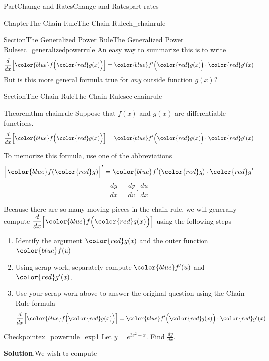\documentclass{tufte-book}
\newcommand{\blocktitlefont}{\relax}
\numberwithin{equation}{chapter}
\newcommand{\red}[1]{   {\color{red}   #1}   }
\newcommand{\blue}[1]{  {\color{blue}  #1}  }
\newcommand{\ddx}[1]{ \dfrac{d}{dx} \Big[ #1 \Big]  }
\newcommand{\D}[1]{ \Big[ #1 \Big]'  }
\begin{document}
\begin{partptx}{Part}{Change and Rates}{}{Change and Rates}{}{}{part-rates}
\begin{chapterptx}{Chapter}{The Chain Rule}{}{The Chain Rule}{}{}{ch_chainrule}
\begin{sectionptx}{Section}{The Generalized Power Rule}{}{The Generalized Power Rule}{}{}{sec_generalizedpowerrule}
An easy way to summarize this is to write%
\begin{equation*}
\ddx{ \blue{ f\Big(\red{g(x)}\Big) } } = \blue{f'\Big( \red{g(x)}\Big)}\cdot \red{g'(x)}
\end{equation*}
But is this more general formula true for \emph{any} outside function \(g(x)\)?%
\end{sectionptx}
%
%
\typeout{************************************************}
\typeout{************************************************}
%
\begin{sectionptx}{Section}{The Chain Rule}{}{The Chain Rule}{}{}{sec-chainrule}
\begin{theorem}{Theorem}{}{}{thm-chainrule}%
Suppose that \(f(x)\) and \(g(x)\) are differentiable functions.%
\begin{equation*}
\ddx{ \blue{ f\Big(\red{g(x)}\Big) } } = \blue{f'\Big( \red{g(x)}\Big)}\cdot \red{g'(x)}
\end{equation*}
%
\par
To memorize this formula, use one of the abbreviations%
\begin{equation*}
\D{ \blue{f(\red{g})} } = \blue{f'(\red{g})} \cdot \red{g'}
\end{equation*}
%
\begin{equation*}
\dfrac{dy}{dx} = \dfrac{dy}{du}\cdot \dfrac{du}{dx}
\end{equation*}
%
\end{theorem}
Because there are so many moving pieces in the chain rule, we will generally compute \(\ddx{ \blue{ f\Big(\red{g(x)}\Big) } }\) using the following steps%
\begin{enumerate}
\item{}Identify the argument \(\red{g(x)}\) and the outer function \(\blue{f(u)}\)%
\item{}Using scrap work, separately compute \(\blue{f'(u)}\) and \(\red{g'(x)}\).%
\item{}Use your scrap work above to answer the original question using the Chain Rule formula%
\begin{equation*}
\ddx{ \blue{ f\Big(\red{g(x)}\Big) } } = \blue{f'\Big( \red{g(x)}\Big)}\cdot \red{g'(x)}
\end{equation*}
%
\end{enumerate}
%
\begin{inlineexercise}{Checkpoint}{}{ex_powerrule_exp1}%
Let \(y= e^{3x^2+x}\).  Find \(\frac{dy}{dx}\).%
\par\smallskip%
\noindent\textbf{\blocktitlefont Solution}.\hypertarget{ex_powerrule_exp1-2}{}\quad{}We wish to compute%

\end{inlineexercise}
\end{sectionptx}
\end{chapterptx}
\end{partptx}
\end{document}
